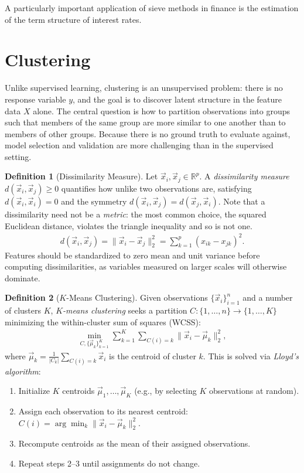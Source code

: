 \documentclass[11pt]{article}
\theoremstyle{definition}
\newtheorem{definition}{Definition}[section]
\theoremstyle{plain}
\theoremstyle{remark}
\begin{document}
A particularly important application of sieve methods in finance is the estimation of the term structure of interest rates.

\section{Clustering}

Unlike supervised learning, clustering is an unsupervised problem: there is no response variable $y$, and the goal is to discover latent structure in the feature data $X$ alone. The central question is how to partition observations into groups such that members of the same group are more similar to one another than to members of other groups. Because there is no ground truth to evaluate against, model selection and validation are more challenging than in the supervised setting.

\begin{definition}[Dissimilarity Measure]
    Let $\vec{x}_i, \vec{x}_j \in \mathbb{R}^p$. A \textit{dissimilarity measure} $d(\vec{x}_i, \vec{x}_j) \geq 0$ quantifies how unlike two observations are, satisfying $d(\vec{x}_i, \vec{x}_i) = 0$ and the symmetry $d(\vec{x}_i, \vec{x}_j) = d(\vec{x}_j, \vec{x}_i)$. Note that a dissimilarity need not be a \emph{metric}: the most common choice, the squared Euclidean distance, violates the triangle inequality and so is not one.
    \begin{align}
        d(\vec{x}_i, \vec{x}_j) = \|\vec{x}_i - \vec{x}_j\|_2^2 = \sum_{k=1}^p (x_{ik} - x_{jk})^2.
    \end{align}
    Features should be standardized to zero mean and unit variance before computing dissimilarities, as variables measured on larger scales will otherwise dominate.
\end{definition}

\begin{definition}[$K$-Means Clustering]
    Given observations $\{\vec{x}_i\}_{i=1}^n$ and a number of clusters $K$, \textit{$K$-means clustering} seeks a partition $C: \{1,\dots,n\} \to \{1,\dots,K\}$ minimizing the within-cluster sum of squares (WCSS):
    \begin{align}
        \min_{C,\{\vec{\mu}_k\}_{k=1}^K} \sum_{k=1}^K \sum_{C(i)=k} \|\vec{x}_i - \vec{\mu}_k\|_2^2,
    \end{align}
    where $\vec{\mu}_k = \frac{1}{|C_k|}\sum_{C(i)=k}\vec{x}_i$ is the centroid of cluster $k$. This is solved via \textit{Lloyd's algorithm}:
    \begin{enumerate}
        \item Initialize $K$ centroids $\vec{\mu}_1,\dots,\vec{\mu}_K$ (e.g., by selecting $K$ observations at random).
        \item Assign each observation to its nearest centroid: $C(i) = \arg\min_k \|\vec{x}_i - \vec{\mu}_k\|_2^2$.
        \item Recompute centroids as the mean of their assigned observations.
        \item Repeat steps 2--3 until assignments do not change.
    \end{enumerate}
\end{definition}
\end{document}
